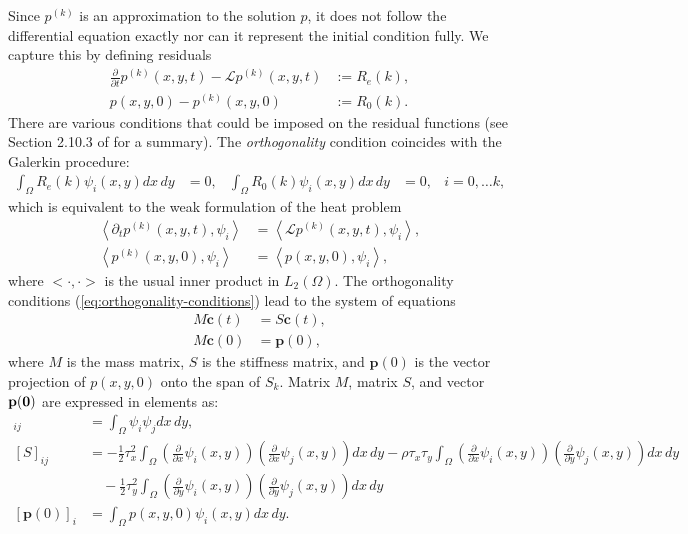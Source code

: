 Since $p^{(k)}$ is an approximation to the solution $p$, it
does not follow the differential equation exactly nor can it represent
the initial condition fully. We capture this by defining residuals
\begin{align*}
  \frac{\partial}{\partial t} p^{(k)}(x,y,t) - \mathcal{L}p^{(k)}(x,y,t) &:= R_e(k), \\
  p(x,y,0) - p^{(k)}(x,y,0) &:= R_0(k).
\end{align*}
There are various conditions that could be imposed on the residual
functions (see Section 2.10.3 of \cite{norrie1973finite} for a
summary). The \textit{orthogonality} condition coincides with the
Galerkin procedure:
\begin{align}
  \displaystyle \int_{\Omega} R_e(k) \psi_i(x,y) dx\,dy &= 0,& \displaystyle \int_{\Omega} R_0(k) \psi_i(x,y) dx\,dy &= 0,& i = 0,\ldots k, \label{eq:orthogonality-conditions}
\end{align}
which is equivalent to the weak formulation of the heat problem
\begin{align*}
  \left< \partial_t p^{(k)}(x,y,t), \psi_i \right> &= \left<\mathcal{L}p^{(k)}(x,y,t), \psi_i \right>, \\
  \left< p^{(k)}(x,y,0), \psi_i \right> &= \left<p(x,y,0), \psi_i\right>,
\end{align*}
where $<\cdot, \cdot>$ is the usual inner product in
$L_2(\Omega)$. The orthogonality conditions
(\ref{eq:orthogonality-conditions}) lead to the system of equations
\begin{align}
  M \mathbf{\dot{c}}(t) &= S \mathbf{c}(t), \label{eq:orthogonality-conditions-mat-1}\\
  M \mathbf{c}(0) &= \mathbf{p}(0), \label{eq:orthogonality-conditions-mat-2}
\end{align}
where $M$ is the mass matrix, $S$ is the stiffness matrix, and
$\mathbf{p}(0)$ is the vector projection of $p(x,y,0)$ onto the
span of $S_k$. Matrix $M$, matrix $S$, and vector $\bf{p}(0)$ are expressed in elements as:
\begin{align*}
  [M]_{ij} &= \displaystyle \int_\Omega \psi_i \psi_j dx\,dy, \\
  [S]_{ij} &= -\frac{1}{2}\tau_x^2 \displaystyle \int_\Omega \left( \frac{\partial}{\partial x} \psi_i(x,y) \right) \left( \frac{\partial}{\partial x} \psi_j(x,y) \right) dx\,dy -\rho\tau_x\tau_y \displaystyle \int_\Omega \left( \frac{\partial}{\partial x} \psi_i(x,y) \right) \left( \frac{\partial}{\partial y} \psi_j(x,y) \right) dx\,dy \\
         &\quad -\frac{1}{2}\tau_y^2 \displaystyle \int_\Omega \left( \frac{\partial}{\partial y} \psi_i(x,y) \right) \left( \frac{\partial}{\partial y} \psi_j(x,y) \right) dx\,dy \\
  [\mathbf{p}(0)]_i &= \displaystyle \int_\Omega p(x,y,0) \psi_i(x,y) dx\,dy.
\end{align*}

